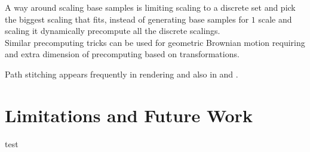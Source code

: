 \documentclass[a4paper,12pt]{article}
\begin{document}
A way around scaling base samples is limiting scaling to a
discrete set and pick the biggest scaling that fits, instead
of generating base samples for $1$ scale and scaling it dynamically
precompute all the discrete scalings. \\

Similar precomputing tricks can be used for geometric Brownian motion
requiring and extra dimension of precomputing based on transformations.

\begin{related}
    Path stitching appears frequently in rendering and also in \cite{das_sarma_fast_2015}
    and \cite{ji_reusing_2012}.
\end{related}

\section{Limitations and Future Work}
test

\newpage
\printbibliography
\newpage

\end{document}
